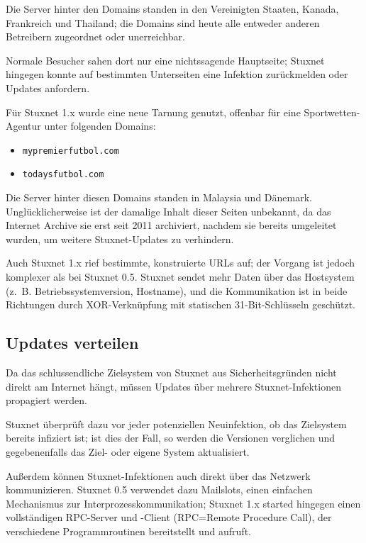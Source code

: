 \documentclass{article}
\begin{document}
Die Server hinter den Domains standen in den Vereinigten Staaten, Kanada, Frankreich und Thailand; %
die Domains sind heute alle entweder anderen Betreibern zugeordnet oder unerreichbar.

Normale Besucher sahen dort nur eine nichtssagende Hauptseite\cite{archive_best_advertising};
Stuxnet hingegen konnte auf bestimmten Unterseiten eine Infektion zurückmelden oder Updates anfordern.

Für Stuxnet 1.x wurde eine neue Tarnung genutzt, offenbar für eine Sportwetten-Agentur unter folgenden Domains:

\begin{itemize}
\item \texttt{mypremierfutbol.com}
\item \texttt{todaysfutbol.com}
\end{itemize}

Die Server hinter diesen Domains standen in Malaysia und Dänemark.
Unglücklicherweise ist der damalige Inhalt dieser Seiten unbekannt,
da das Internet Archive sie erst seit 2011 archiviert,
nachdem sie bereits umgeleitet wurden, um weitere Stuxnet-Updates zu verhindern.

Auch Stuxnet 1.x rief bestimmte, konstruierte URLs auf;
der Vorgang ist jedoch komplexer als bei Stuxnet 0.5.
Stuxnet sendet mehr Daten über das Hostsystem (z.~B. Betriebssystemversion, Hostname),
und die Kommunikation ist in beide Richtungen durch XOR-Verknüpfung mit statischen 31-Bit-Schlüsseln geschützt.

\subsection{Updates verteilen}

Da das schlussendliche Zielsystem von Stuxnet aus Sicherheitsgründen nicht direkt am Internet hängt,
müssen Updates über mehrere Stuxnet-Infektionen propagiert werden.

Stuxnet überprüft dazu vor jeder potenziellen Neuinfektion, ob das Zielsystem bereits infiziert ist;
ist dies der Fall, so werden die Versionen verglichen und gegebenenfalls das Ziel- oder eigene System aktualisiert.

Außerdem können Stuxnet-Infektionen auch direkt über das Netzwerk kommunizieren.
Stuxnet 0.5 verwendet dazu Mailslots, einen einfachen Mechanismus zur Interprozesskommunikation;
Stuxnet 1.x started hingegen einen vollständigen RPC-Server und -Client (RPC=Remote Procedure Call), %
der verschiedene Programmroutinen bereitstellt und aufruft.
\end{document}
